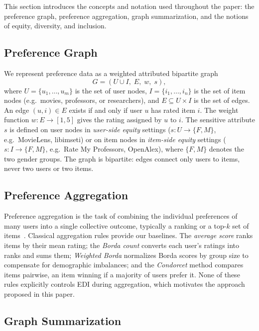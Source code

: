 \documentclass[a4paper,fleqn]{cas-dc}
\begin{document}
This section introduces the concepts and notation used throughout the paper:
the preference graph, preference aggregation, graph summarization, and the
notions of equity, diversity, and inclusion.

\subsection{Preference Graph}

We represent preference data as a weighted attributed bipartite graph
\[
  G = (U \cup I,\; E,\; w,\; s),
\]
where $U = \{u_1, \ldots, u_m\}$ is the set of user nodes, $I = \{i_1,
\ldots, i_n\}$ is the set of item nodes (e.g.\ movies, professors, or
researchers), and $E \subseteq U \times I$ is the set of edges. An edge
$(u, i) \in E$ exists if and only if user $u$ has rated item $i$. The weight
function $w : E \rightarrow [1, 5]$ gives the rating assigned by $u$ to $i$.
The sensitive attribute $s$ is defined on user nodes in \emph{user-side
equity} settings ($s : U \rightarrow \{F, M\}$, e.g.\ MovieLens, libimseti)
or on item nodes in \emph{item-side equity} settings ($s : I \rightarrow
\{F, M\}$, e.g.\ Rate My Professors, OpenAlex), where $\{F, M\}$ denotes
the two gender groups. The graph is bipartite: edges connect only users to
items, never two users or two items.

\subsection{Preference Aggregation}

Preference aggregation is the task of combining the individual preferences
of many users into a single collective outcome, typically a ranking or a
top-$k$ set of items~\cite{ricci2011recommender}. Classical aggregation
rules provide our baselines. The \emph{average score} ranks items by their
mean rating; the \emph{Borda count} converts each user's ratings into ranks
and sums them; \emph{Weighted Borda} normalizes Borda scores by group size
to compensate for demographic imbalances; and the \emph{Condorcet} method
compares items pairwise, an item winning if a majority of users prefer it.
None of these rules explicitly controls EDI during aggregation, which
motivates the approach proposed in this paper.

\subsection{Graph Summarization}
\end{document}
